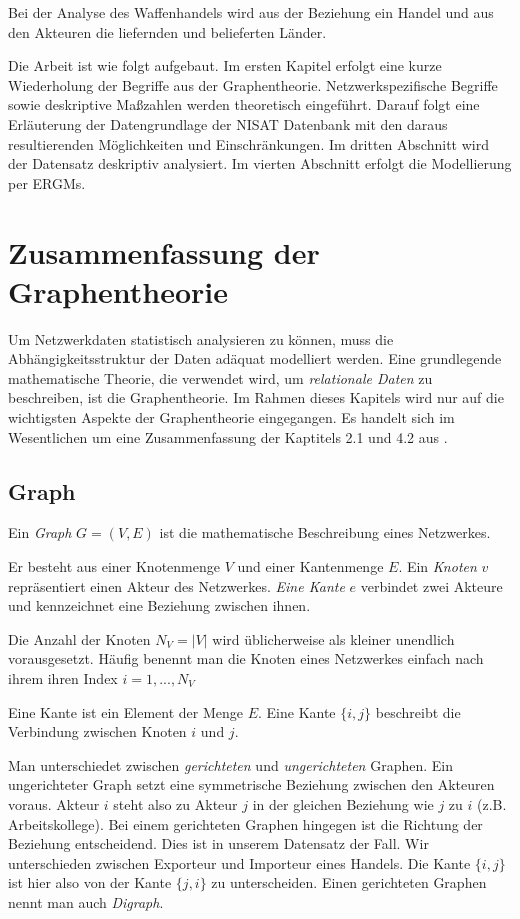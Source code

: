 \documentclass[a4paper,ngerman,oneside,titlepage,bibliography=totoc,11pt]{scrreprt}
\begin{document}
Bei der Analyse des Waffenhandels wird aus der Beziehung ein Handel und aus den Akteuren die liefernden und belieferten Länder.

Die Arbeit ist wie folgt aufgebaut. Im ersten Kapitel erfolgt eine kurze Wiederholung der Begriffe aus der Graphentheorie. Netzwerkspezifische Begriffe sowie deskriptive Maßzahlen werden theoretisch eingeführt. Darauf folgt eine Erläuterung der Datengrundlage der NISAT Datenbank mit den daraus resultierenden Möglichkeiten und Einschränkungen. Im dritten Abschnitt wird der Datensatz deskriptiv analysiert. Im vierten Abschnitt erfolgt die Modellierung per ERGMs.





\section{Zusammenfassung der Graphentheorie}

Um Netzwerkdaten statistisch analysieren zu können, muss die Abhängigkeitsstruktur der Daten adäquat modelliert werden. Eine grundlegende mathematische Theorie, die verwendet wird, um \emph{relationale Daten} zu beschreiben, ist die Graphentheorie. Im Rahmen dieses Kapitels wird nur auf die wichtigsten Aspekte der Graphentheorie eingegangen. Es handelt sich im Wesentlichen um eine Zusammenfassung der Kaptitels 2.1 und 4.2 aus \cite{kol09}.

\subsection{Graph}

Ein \emph{Graph} $G = (V,E)$ ist die mathematische Beschreibung eines Netzwerkes. 

Er besteht aus einer Knotenmenge $V$ und einer Kantenmenge $E$. Ein \emph{Knoten} $v$ repräsentiert einen Akteur des Netzwerkes. \emph{Eine Kante} $e$ verbindet zwei Akteure und kennzeichnet eine Beziehung zwischen ihnen.

Die Anzahl der Knoten $N_V = |V|$ wird üblicherweise als kleiner unendlich vorausgesetzt. Häufig benennt man die Knoten eines Netzwerkes einfach nach ihrem ihren Index $i = 1, ..., N_V$

Eine Kante ist ein Element der Menge $E$. Eine Kante $\{i,j\}$ beschreibt die Verbindung zwischen Knoten $i$ und $j$. 

Man unterschiedet zwischen \emph{gerichteten} und \emph{ungerichteten} Graphen. Ein ungerichteter Graph setzt eine symmetrische Beziehung zwischen den Akteuren voraus. Akteur $i$ steht also zu Akteur $j$ in der gleichen Beziehung wie $j$ zu $i$ (z.B. Arbeitskollege). Bei einem gerichteten Graphen hingegen ist die Richtung der Beziehung entscheidend. Dies ist in unserem Datensatz der Fall. Wir unterschieden zwischen Exporteur und Importeur eines Handels. Die Kante $\{i,j\}$ ist hier also von der Kante $\{j,i\}$ zu unterscheiden. Einen gerichteten Graphen nennt man auch \emph{Digraph}.
\end{document}
